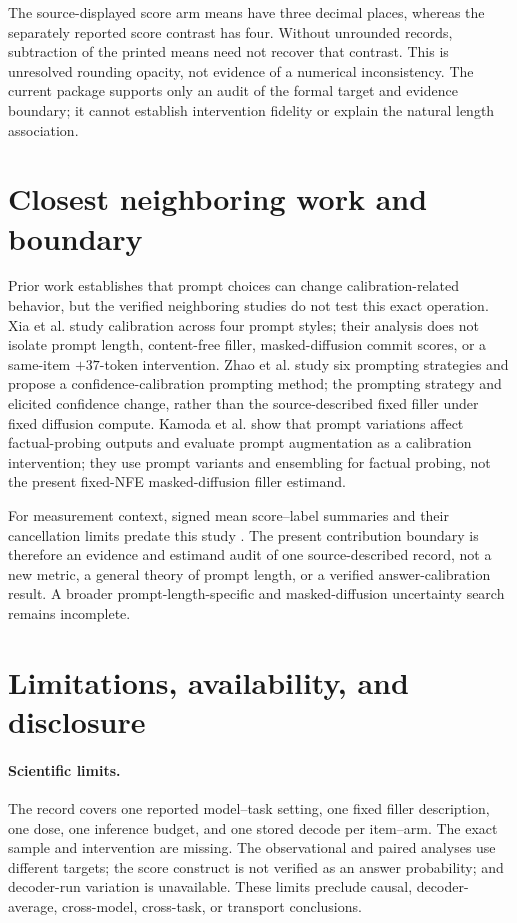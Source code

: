 \documentclass{article}
\begin{document}
The source-displayed score arm means have three decimal places, whereas the separately
reported score contrast has four.  Without unrounded records, subtraction of the
printed means need not recover that contrast.  This is unresolved rounding opacity,
not evidence of a numerical inconsistency.  The current package supports only an audit
of the formal target and evidence boundary; it cannot establish intervention fidelity
or explain the natural length association.

\section{Closest neighboring work and boundary}
\label{sec:related}

Prior work establishes that prompt choices can change calibration-related behavior, but
the verified neighboring studies do not test this exact operation.  Xia et al.
\citep{xia2025influences} study calibration across four prompt styles; their analysis
does not isolate prompt length, content-free filler, masked-diffusion commit scores, or
a same-item $+37$-token intervention.  Zhao et al. \citep{zhao2024far} study six
prompting strategies and propose a confidence-calibration prompting method; the
prompting strategy and elicited confidence change, rather than the source-described
fixed filler under fixed diffusion compute.  Kamoda et al.
\citep{kamoda2023tta} show that prompt variations affect factual-probing outputs and
evaluate prompt augmentation as a calibration intervention; they use prompt variants
and ensembling for factual probing, not the present fixed-NFE masked-diffusion filler
estimand.

For measurement context, signed mean score--label summaries and their cancellation
limits predate this study \citep{ao2023miscalibration,seligmann2023beyond,cruz2024riskscores}.
The present contribution boundary is therefore an evidence and estimand audit of one
source-described record, not a new metric, a general theory of prompt length, or a
verified answer-calibration result.  A broader prompt-length-specific and
masked-diffusion uncertainty search remains incomplete.

\section{Limitations, availability, and disclosure}
\label{sec:limits}

\paragraph{Scientific limits.}
The record covers one reported model--task setting, one fixed filler description, one
dose, one inference budget, and one stored decode per item--arm.  The exact sample and
intervention are missing.  The observational and paired analyses use different targets;
the score construct is not verified as an answer probability; and decoder-run
variation is unavailable.  These limits preclude causal, decoder-average, cross-model,
cross-task, or transport conclusions.
\end{document}
